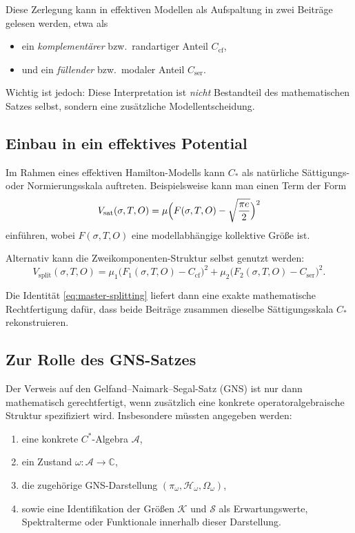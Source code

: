 \documentclass[12pt,a4paper]{article}
\begin{document}
	Diese Zerlegung kann in effektiven Modellen als Aufspaltung in zwei Beiträge gelesen werden, etwa als
	\begin{itemize}
		\item ein \emph{komplementärer} bzw.\ randartiger Anteil \(C_{\mathrm{cf}}\),
		\item und ein \emph{füllender} bzw.\ modaler Anteil \(C_{\mathrm{ser}}\).
	\end{itemize}
	
	Wichtig ist jedoch: Diese Interpretation ist \emph{nicht} Bestandteil des mathematischen Satzes selbst, sondern eine zusätzliche Modellentscheidung.
	
	\subsection{Einbau in ein effektives Potential}
	
	Im Rahmen eines effektiven Hamilton-Modells kann \(C_*\) als natürliche Sättigungs- oder Normierungsskala auftreten. Beispielsweise kann man einen Term der Form
	\begin{equation}
		V_{\mathrm{sat}}(\sigma,T,O)
		=
		\mu\Bigl(F(\sigma,T,O)-\sqrt{\frac{\pi e}{2}}\Bigr)^2
		\label{eq:Vsat}
	\end{equation}
	einführen, wobei \(F(\sigma,T,O)\) eine modellabhängige kollektive Größe ist.
	
	Alternativ kann die Zweikomponenten-Struktur selbst genutzt werden:
	\begin{equation}
		V_{\mathrm{split}}(\sigma,T,O)
		=
		\mu_1\bigl(F_1(\sigma,T,O)-C_{\mathrm{cf}}\bigr)^2
		+
		\mu_2\bigl(F_2(\sigma,T,O)-C_{\mathrm{ser}}\bigr)^2.
		\label{eq:Vsplit}
	\end{equation}
	
	Die Identität \eqref{eq:master-splitting} liefert dann eine exakte mathematische Rechtfertigung dafür, dass beide Beiträge zusammen dieselbe Sättigungsskala \(C_*\) rekonstruieren.
	
	\subsection{Zur Rolle des GNS-Satzes}
	
	Der Verweis auf den Gelfand--Naimark--Segal-Satz (GNS) ist nur dann mathematisch gerechtfertigt, wenn zusätzlich eine konkrete operatoralgebraische Struktur spezifiziert wird. Insbesondere müssten angegeben werden:
	\begin{enumerate}
		\item eine konkrete \(C^*\)-Algebra \(\mathcal A\),
		\item ein Zustand \(\omega:\mathcal A\to\mathbb C\),
		\item die zugehörige GNS-Darstellung \((\pi_\omega,\mathcal H_\omega,\Omega_\omega)\),
		\item sowie eine Identifikation der Größen \(\mathcal K\) und \(\mathcal S\) als Erwartungswerte, Spektralterme oder Funktionale innerhalb dieser Darstellung.
	\end{enumerate}
	
\end{document}
